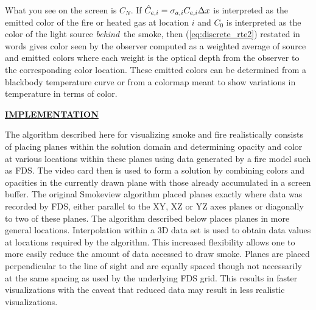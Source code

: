 \documentclass[11pt]{article}
\newcommand{\ssection}[1]{\underline{\bf #1}}
\begin{document}
\noindent What you see on the screen is $C_N$.
If $\hat{C}_{e,i}=\sigma_{a,i}C_{e,i}\Delta x$ is interpreted as
the emitted color of the fire or
heated gas at location $i$ and $C_0$ is interpreted as the color
of the light source {\em behind}\ the smoke, then
(\ref{eq:discrete_rte2}) restated in words gives color seen by the
observer computed as a weighted average of source and emitted
colors where each weight is the optical depth from the observer to
the corresponding color location.  These emitted colors can be
determined from a blackbody temperature curve or from a colormap
meant to show variations in temperature in terms of color.


\ssection{IMPLEMENTATION}

The algorithm described here for visualizing smoke and fire realistically consists of placing
planes within the solution domain and determining opacity and color
at various locations within these planes
using data generated by a fire model such as FDS.  The video card then is
used to form a solution by combining colors and opacities in the currently drawn
plane with those already accumulated in a screen buffer.
The original Smokeview algorithm placed planes exactly where data was recorded by FDS,
either parallel to the XY, XZ or YZ axes planes or diagonally to two of these planes.
The algorithm described below places planes in more general locations. Interpolation
within a 3D data set is used to obtain data values at locations required by the algorithm.
This increased flexibility
allows one to more easily reduce the amount of data accessed to draw smoke.
Planes are placed perpendicular to the line of sight and are equally spaced though not
necessarily at the same spacing as used by the underlying FDS grid.
This results in faster visualizations with the caveat that reduced data may result
in less realistic visualizations.
\end{document}
